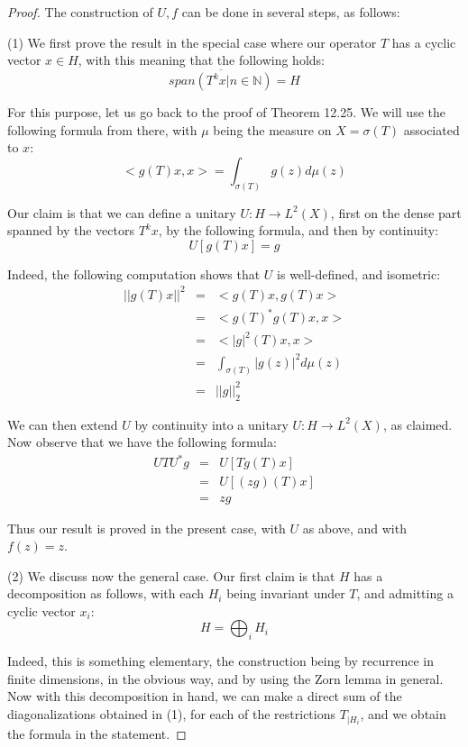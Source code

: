 \documentclass[12pt]{amsbook}
\begin{document}
\begin{proof}
The construction of $U,f$ can be done in several steps, as follows:

\medskip

(1) We first prove the result in the special case where our operator $T$ has a cyclic vector $x\in H$, with this meaning that the following holds:
$$\overline{span\left(T^kx\Big|n\in\mathbb N\right)}=H$$

For this purpose, let us go back to the proof of Theorem 12.25. We will use the following formula from there, with $\mu$ being the measure on $X=\sigma(T)$ associated to $x$:
$$<g(T)x,x>=\int_{\sigma(T)}g(z)d\mu(z)$$

Our claim is that we can define a unitary $U:H\to L^2(X)$, first on the dense part spanned by the vectors $T^kx$, by the following formula, and then by continuity:
$$U[g(T)x]=g$$

Indeed, the following computation shows that $U$ is well-defined, and isometric:
\begin{eqnarray*}
||g(T)x||^2
&=&<g(T)x,g(T)x>\\
&=&<g(T)^*g(T)x,x>\\
&=&<|g|^2(T)x,x>\\
&=&\int_{\sigma(T)}|g(z)|^2d\mu(z)\\
&=&||g||_2^2
\end{eqnarray*}

We can then extend $U$ by continuity into a unitary $U:H\to L^2(X)$, as claimed. Now observe that we have the following formula:
\begin{eqnarray*}
UTU^*g
&=&U[Tg(T)x]\\
&=&U[(zg)(T)x]\\
&=&zg
\end{eqnarray*} 

Thus our result is proved in the present case, with $U$ as above, and with $f(z)=z$.

\medskip

(2) We discuss now the general case. Our first claim is that $H$ has a decomposition as follows, with each $H_i$ being invariant under $T$, and admitting a cyclic vector $x_i$:
$$H=\bigoplus_iH_i$$

Indeed, this is something elementary, the construction being by recurrence in finite dimensions, in the obvious way, and by using the Zorn lemma in general. Now with this decomposition in hand, we can make a direct sum of the diagonalizations obtained in (1), for each of the restrictions $T_{|H_i}$, and we obtain the formula in the statement.
\end{proof}
\end{document}
